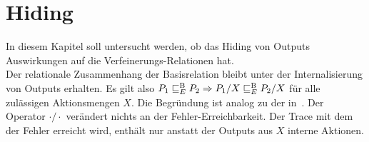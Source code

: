 \section{Hiding}

In diesem Kapitel soll untersucht werden, ob das Hiding von Outputs
Auswirkungen auf die Verfeinerungs-Relationen \ERel{} hat.\\
Der relationale Zusammenhang der Basisrelation \EBRel{} bleibt unter der
Internalisierung von Outputs erhalten. Es gilt also $P_1 \sqsubseteq  _E^\mathrm{B} P_2 \Rightarrow
P_1/X \sqsubseteq  _E^\mathrm{B} P_2/X$ für alle zulässigen Aktionsmengen $X$. Die Begründung ist
analog zu der in~\cite{Schinko2016BA}. Der Operator $\cdot /\cdot$ verändert
nichts an der Fehler-Erreichbarkeit. Der Trace mit dem der Fehler erreicht
wird, enthält nur anstatt der Outputs aus $X$ interne Aktionen.

